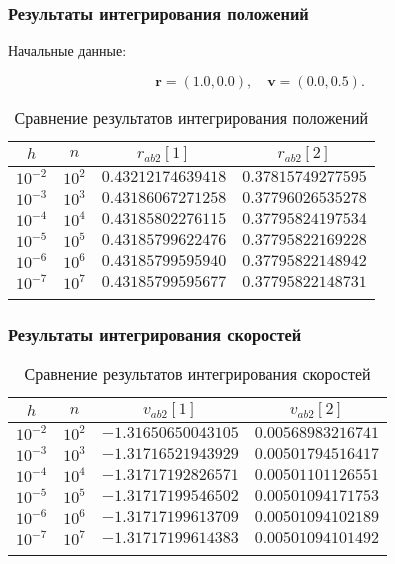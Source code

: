 \begin{frame}
\frametitle{Результаты интегрирования положений}

Начальные данные:

\su
\begin{equation}
  \mathbf{r} = (1.0, 0.0), \quad \mathbf{v} = (0.0, 0.5).
\end{equation}

\begin{table}[h]
  \centering
  \caption{Сравнение результатов интегрирования положений}
  \begin{tabular}{cccc}
    \toprule
    $ h $ &
    $ n $ &
    $ r_{ab2}[1] $ &
    $ r_{ab2}[2] $ \\
    \midrule
    $ 10^{-2} $ & $ 10^2 $ & $ 0.43212174639418 $ & $ 0.37815749277595 $ \\
    \arrayrulecolor{black!40}
    \midrule
    $ 10^{-3} $ & $ 10^3 $ & $ 0.43186067271258 $ & $ 0.37796026535278 $ \\
    \midrule
    $ 10^{-4} $ & $ 10^4 $ & $ 0.43185802276115 $ & $ 0.37795824197534 $ \\
    \midrule
    $ 10^{-5} $ & $ 10^5 $ & $ 0.43185799622476 $ & $ 0.37795822169228 $ \\
    \midrule
    $ 10^{-6} $ & $ 10^6 $ & $ 0.43185799595940 $ & $ 0.37795822148942 $ \\
    \midrule
    $ 10^{-7} $ & $ 10^7 $ & $ 0.43185799595677 $ & $ 0.37795822148731 $ \\
    \arrayrulecolor{black}
    \bottomrule
  \end{tabular}
\end{table}

\end{frame}

\begin{frame}
\frametitle{Результаты интегрирования скоростей}

\begin{table}[h]
  \centering
  \caption{Сравнение результатов интегрирования скоростей}
  \begin{tabular}{cccc}
    \toprule
    $ h $ &
    $ n $ &
    $ v_{ab2}[1] $ &
    $ v_{ab2}[2] $ \\
    \midrule
    $ 10^{-2} $ & $ 10^2 $ & $ -1.31650650043105 $ & $ 0.00568983216741 $ \\
    \arrayrulecolor{black!40}
    \midrule
    $ 10^{-3} $ & $ 10^3 $ & $ -1.31716521943929 $ & $ 0.00501794516417 $ \\
    \midrule
    $ 10^{-4} $ & $ 10^4 $ & $ -1.31717192826571 $ & $ 0.00501101126551 $ \\
    \midrule
    $ 10^{-5} $ & $ 10^5 $ & $ -1.31717199546502 $ & $ 0.00501094171753 $ \\
    \midrule
    $ 10^{-6} $ & $ 10^6 $ & $ -1.31717199613709 $ & $ 0.00501094102189 $ \\
    \midrule
    $ 10^{-7} $ & $ 10^7 $ & $ -1.31717199614383 $ & $ 0.00501094101492 $ \\
    \arrayrulecolor{black}
    \bottomrule
  \end{tabular}
\end{table}

\end{frame}

